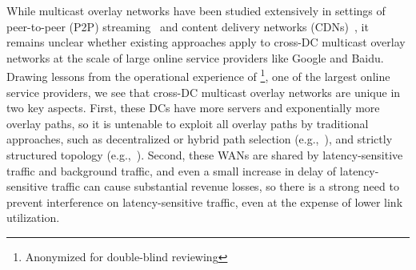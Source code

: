 While multicast overlay networks have been studied extensively
in settings of peer-to-peer (P2P) streaming~\cite{zhang2005coolstreaming,PPStream} and
content delivery networks (CDNs)~\cite{sripanidkulchai2004analysis,Andreev2013Designing}, it remains unclear
whether existing approaches apply to cross-DC multicast overlay
networks at the scale of large online service providers like
Google and Baidu.
Drawing lessons from the operational experience of
\company\footnote{Anonymized for double-blind reviewing}, one of
the largest online service providers, we see that cross-DC
multicast overlay networks are unique in two key aspects.
First, these DCs have more servers and exponentially more overlay
paths, so it is untenable to exploit all overlay paths by
traditional approaches, such as decentralized or hybrid path
selection (e.g.,~\cite{kostic2003bullet,Repantis2010Scaling}), and strictly structured topology
(e.g.,~\cite{Nygren2010The}).
Second, these WANs are shared by latency-sensitive traffic and
background traffic, and even a small increase in delay of
latency-sensitive traffic can cause substantial revenue losses,
so there is a strong need to prevent interference on
latency-sensitive traffic, even at the expense of lower link
utilization.


%

